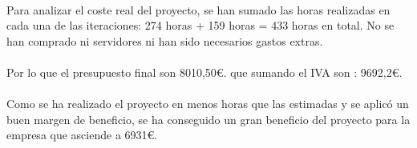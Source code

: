 
\paragraph{} Para analizar el coste real del proyecto, se han sumado las horas realizadas en  cada una de las iteraciones: 274 horas + 159 horas = 433 horas en total. No se han comprado ni servidores ni han sido necesarios gastos extras.  

\paragraph{} Por lo que el presupuesto final son 8010,50$\euro$. que sumando el IVA son : 9692,2$\euro$.

\paragraph{} Como se ha realizado el proyecto en menos horas que las estimadas y se aplicó un buen margen de beneficio, se ha conseguido un gran beneficio del proyecto para la empresa que asciende a 6931$\euro$.